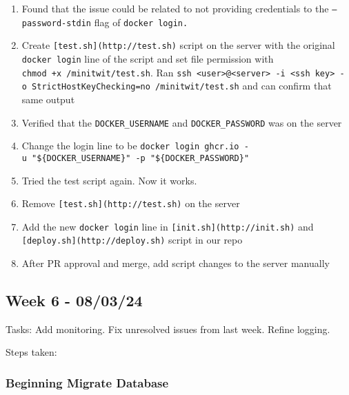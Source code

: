 \begin{enumerate}
    \item Found that the issue could be related to not providing credentials to the \texttt{—password-stdin} flag of \texttt{docker\ login.}
    \item Create \texttt{{[}test.sh{]}(http://test.sh)} script on the server with the original \texttt{docker\ login} line of the script and set file permission with \texttt{chmod\ +x\ /minitwit/test.sh}. Ran \texttt{ssh\ \textless{}user\textgreater{}@\textless{}server\textgreater{}\ -i\ \textless{}ssh\ key\textgreater{}\ -o\ StrictHostKeyChecking=no\ \textquotesingle{}/minitwit/test.sh\textquotesingle{}} and can confirm that same output
    \item Verified that the \texttt{DOCKER\_USERNAME} and \texttt{DOCKER\_PASSWORD} was on the server
    \item Change the login line to be \texttt{docker\ login\ ghcr.io\ -u\ "\$\{DOCKER\_USERNAME\}"\ -p\ "\$\{DOCKER\_PASSWORD\}"}
    \item Tried the test script again. Now it works.
    \item Remove \texttt{{[}test.sh{]}(http://test.sh)} on the server
    \item Add the new \texttt{docker\ login} line in \texttt{{[}init.sh{]}(http://init.sh)} and \texttt{{[}deploy.sh{]}(http://deploy.sh)} script in our repo
    \item After PR approval and merge, add script changes to the server manually
\end{enumerate}

\subsection{Week 6 - 08/03/24}
\label{log:week6}

Tasks: Add monitoring. Fix unresolved issues from last week. Refine
logging.

Steps taken:

\subsubsection{Beginning Migrate Database}
\label{log:beginning-migrate-database}

